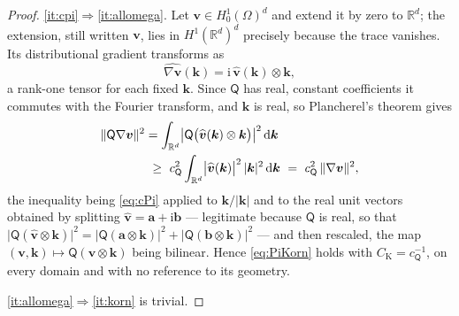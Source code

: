 \documentclass[11pt]{article}
\theoremstyle{plain}
\theoremstyle{definition}
\theoremstyle{remark}
\newcommand{\AnyProj}{\mathsf{Q}}
\newcommand{\bv}{\boldsymbol{v}}
\newcommand{\bk}{\boldsymbol{k}}
\newcommand{\dd}{\,\mathrm{d}}
\newcommand{\CK}{C_{\mathrm{K}}}
\newcommand{\cP}{c_{\AnyProj}}
\DeclarePairedDelimiter{\norm}{\lVert}{\rVert}
\begin{document}
\begin{proof}
\ref{it:cpi}$\Rightarrow$\ref{it:allomega}. Let $\bv\in H^1_0(\Omega)^d$ and extend it by zero
to $\mathbb{R}^d$; the extension, still written $\bv$, lies in $H^1(\mathbb{R}^d)^d$ precisely
because the trace vanishes. Its distributional gradient transforms as
\begin{equation}\label{eq:fourier-grad}
  \widehat{\nabla\bv}(\bk)=\mathrm{i}\,\widehat{\bv}(\bk)\otimes\bk ,
\end{equation}
a rank{-}one tensor for each fixed $\bk$. Since $\AnyProj$ has real, constant coefficients it
commutes with the Fourier transform, and $\bk$ is real, so Plancherel's theorem gives
\begin{equation}\label{eq:plancherel}
\begin{aligned}
  \norm{\AnyProj\nabla\bv}^2
  &= \int_{\mathbb{R}^d}\bigl|\AnyProj\bigl(\widehat{\bv}(\bk)\otimes\bk\bigr)\bigr|^2\dd\bk \\
  &\ \ge\ \cP^2\int_{\mathbb{R}^d}\bigl|\widehat{\bv}(\bk)\bigr|^2\,|\bk|^2\dd\bk
  \ =\ \cP^2\,\norm{\nabla\bv}^2 ,
\end{aligned}
\end{equation}
the inequality being \cref{eq:cPi} applied to $\bk/|\bk|$ and to the real unit vectors
obtained by splitting $\widehat{\bv}=\boldsymbol{a}+\mathrm{i}\boldsymbol{b}$ --- legitimate
because $\AnyProj$ is real, so that
$\bigl|\AnyProj(\widehat{\bv}\otimes\bk)\bigr|^2
=\bigl|\AnyProj(\boldsymbol{a}\otimes\bk)\bigr|^2+\bigl|\AnyProj(\boldsymbol{b}\otimes\bk)\bigr|^2$
--- and then rescaled, the map $(\bv,\bk)\mapsto\AnyProj(\bv\otimes\bk)$ being bilinear. Hence \cref{eq:PiKorn} holds with
$\CK=\cP^{-1}$, on every domain and with no reference to its geometry.

\ref{it:allomega}$\Rightarrow$\ref{it:korn} is trivial.


\end{proof}
\end{document}
